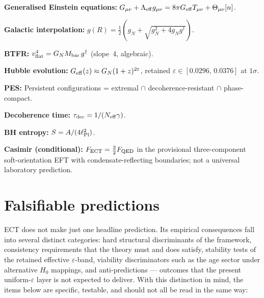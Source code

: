 \documentclass[11pt,a4paper]{article}
\begin{document}
\textbf{Generalised Einstein equations:}
$G_{\mu\nu} + \Lambda_{\rm eff}g_{\mu\nu} = 8\pi G_{\rm eff}T_{\mu\nu} + \Theta_{\mu\nu}[n]$.

\textbf{Galactic interpolation:}
$g(R) = \frac{1}{2}(g_N + \sqrt{g_N^2 + 4g_Ng^\dagger})$.

\textbf{BTFR:}
$v_{\rm flat}^4 = G_N M_{\rm bar}\,g^\dagger$ (slope~4, algebraic).

\textbf{Hubble evolution:}
$G_{\rm eff}(z) \approx G_N(1+z)^{2\varepsilon}$, retained $\varepsilon \in [0.0296,\,0.0376]$ at $1\sigma$.

\textbf{PES:}
Persistent configurations = extremal $\cap$ decoherence-resistant $\cap$ phase-compact.

\textbf{Decoherence time:}
$\tau_{\rm dec} = 1/(N_{\rm eff}\gamma)$.

\textbf{BH entropy:}
$S = A/(4\ell_{\rm Pl}^2)$.

\textbf{Casimir (conditional):}
$F_{\rm ECT} = \frac{3}{2}F_{\rm QED}$ in the provisional three-component
soft-orientation EFT with condensate-reflecting boundaries; not a
universal laboratory prediction.


\section{Falsifiable predictions}
\label{sec:pop_predictions}

ECT does not make just one headline prediction. Its empirical consequences fall into several distinct categories: hard structural discriminants of the framework, consistency requirements that the theory must and does satisfy, stability tests of the retained effective $\varepsilon$-band, viability discriminators such as the age sector under alternative $H_0$ mappings, and anti-predictions --- outcomes that the present uniform-$\varepsilon$ layer is not expected to deliver. With this distinction in mind, the items below are specific, testable, and should not all be read in the same way:
\end{document}
